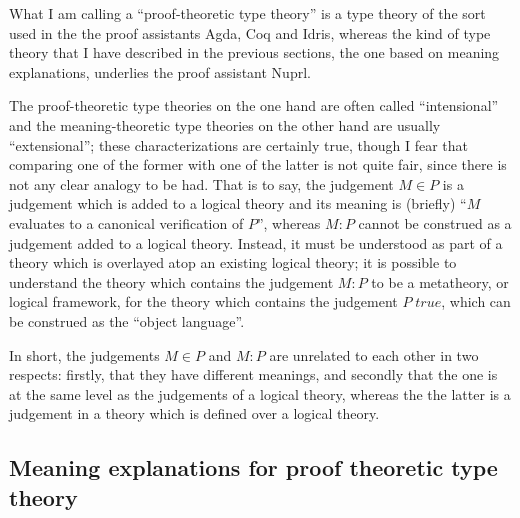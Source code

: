 \documentclass{amsart}
\theoremstyle{definition}
\theoremstyle{remark}
\numberwithin{equation}{section}
\newcommand\istrue[1]{\ensuremath{#1\;\mathit{true}}}
\newcommand\ver[2]{\ensuremath{#1\in#2}}
\newcommand\reduce[2]{\ensuremath{#1\Rightarrow#2}}
\begin{document}
What I am calling a ``proof-theoretic type theory'' is a type theory of the
sort used in the the proof assistants Agda, Coq and Idris, whereas the kind of
type theory that I have described in the previous sections, the one based on
meaning explanations, underlies the proof assistant Nuprl.

The proof-theoretic type theories on the one hand are often called
``intensional'' and the meaning-theoretic type theories on the other hand are
usually ``extensional''; these characterizations are certainly true, though I
fear that comparing one of the former with one of the latter is not quite fair,
since there is not any clear analogy to be had. That is to say, the judgement
\ver{M}{P} is a judgement which is added to a logical theory and its meaning is
(briefly) ``$M$ evaluates to a canonical verification of $P$'', whereas $M:P$ cannot
be construed as a judgement added to a logical theory. Instead, it must be
understood as part of a theory which is overlayed atop an existing logical
theory; it is possible to understand the theory which contains the judgement
$M:P$ to be a metatheory, or logical framework, for the theory which contains
the judgement \istrue{P}, which can be construed as the ``object language''.

In short, the judgements \ver{M}{P} and $M:P$ are unrelated to each other in
two respects: firstly, that they have different meanings, and secondly that the
one is at the same level as the judgements of a logical theory, whereas the the
latter is a judgement in a theory which is defined over a logical theory.

\subsection{Meaning explanations for proof theoretic type theory}

\end{document}
